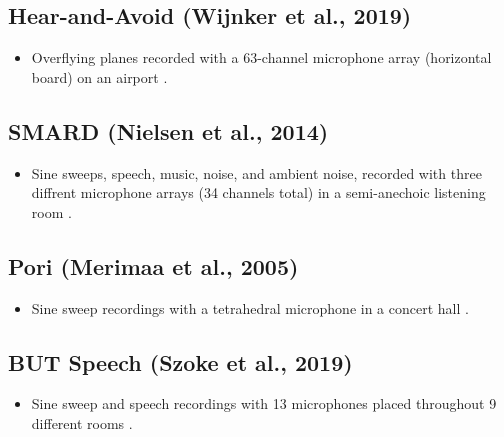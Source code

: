 \documentclass[14pt, legalpaper]{extarticle}
\begin{document}
\subsection{Hear-and-Avoid (Wijnker et al., 2019)}

\begin{itemize}

\item Overflying planes recorded with a 63-channel microphone array (horizontal board) on an airport \cite{wijnker2019hear}.

\end{itemize}

\subsection{SMARD (Nielsen et al., 2014)}

\begin{itemize}

\item Sine sweeps, speech, music, noise, and ambient noise, recorded with three diffrent microphone arrays (34 channels total) in a semi-anechoic listening room \cite{nielsen2014single}.

\end{itemize}

\subsection{Pori (Merimaa et al., 2005)}

\begin{itemize}

\item Sine sweep recordings with a tetrahedral microphone in a concert hall \cite{merimaa2005concert}.

\end{itemize}

\subsection{BUT Speech (Szoke et al., 2019)}

\begin{itemize}

\item Sine sweep and speech recordings with 13 microphones placed throughout 9 different rooms \cite{szoke2019building}.

\end{itemize}
\end{document}
